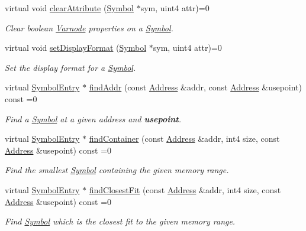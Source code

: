 \begin{DoxyCompactItemize}
virtual void \mbox{\hyperlink{class_scope_afb57165fd0d3c182e18ea24e7231975d}{clear\+Attribute}} (\mbox{\hyperlink{class_symbol}{Symbol}} $\ast$sym, uint4 attr)=0
\begin{DoxyCompactList}\small\item\em Clear boolean \mbox{\hyperlink{class_varnode}{Varnode}} properties on a \mbox{\hyperlink{class_symbol}{Symbol}}. \end{DoxyCompactList}\item 
virtual void \mbox{\hyperlink{class_scope_ae799cc3171536b9ee10497631aea8c5b}{set\+Display\+Format}} (\mbox{\hyperlink{class_symbol}{Symbol}} $\ast$sym, uint4 attr)=0
\begin{DoxyCompactList}\small\item\em Set the display format for a \mbox{\hyperlink{class_symbol}{Symbol}}. \end{DoxyCompactList}\item 
virtual \mbox{\hyperlink{class_symbol_entry}{Symbol\+Entry}} $\ast$ \mbox{\hyperlink{class_scope_aae4ea61f9a55ddfc9defd8548654c8e5}{find\+Addr}} (const \mbox{\hyperlink{class_address}{Address}} \&addr, const \mbox{\hyperlink{class_address}{Address}} \&usepoint) const =0
\begin{DoxyCompactList}\small\item\em Find a \mbox{\hyperlink{class_symbol}{Symbol}} at a given address and {\bfseries{usepoint}}. \end{DoxyCompactList}\item 
virtual \mbox{\hyperlink{class_symbol_entry}{Symbol\+Entry}} $\ast$ \mbox{\hyperlink{class_scope_a609fc1ef47d047717da65827e025cfdd}{find\+Container}} (const \mbox{\hyperlink{class_address}{Address}} \&addr, int4 size, const \mbox{\hyperlink{class_address}{Address}} \&usepoint) const =0
\begin{DoxyCompactList}\small\item\em Find the smallest \mbox{\hyperlink{class_symbol}{Symbol}} containing the given memory range. \end{DoxyCompactList}\item 
virtual \mbox{\hyperlink{class_symbol_entry}{Symbol\+Entry}} $\ast$ \mbox{\hyperlink{class_scope_ab679fe786be2fb949af78054cb2041a8}{find\+Closest\+Fit}} (const \mbox{\hyperlink{class_address}{Address}} \&addr, int4 size, const \mbox{\hyperlink{class_address}{Address}} \&usepoint) const =0
\begin{DoxyCompactList}\small\item\em Find \mbox{\hyperlink{class_symbol}{Symbol}} which is the closest fit to the given memory range. \end{DoxyCompactList}\item 

\end{DoxyCompactItemize}
